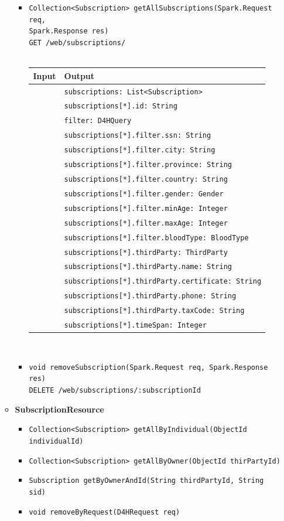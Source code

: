 \documentclass[a4paper, hidelinks, 12pt]{report}
\begin{document}
\begin{itemize}
\begin{itemize}
\begin{itemize}
			\item{\verb|Collection<Subscription> getAllSubscriptions(Spark.Request req,|\\ \verb|Spark.Response res)|\\ \verb|GET /web/subscriptions/|}\\\\
			\begin{tabular}{l | l}
			\textbf{Input} & \textbf{Output} \\
			\hline
				& \verb|subscriptions: List<Subscription>| \\
				& \verb|subscriptions[*].id: String| \\
				& \verb|filter: D4HQuery| \\
				& \verb|subscriptions[*].filter.ssn: String| \\
				& \verb|subscriptions[*].filter.city: String| \\
				& \verb|subscriptions[*].filter.province: String| \\
				& \verb|subscriptions[*].filter.country: String| \\
				& \verb|subscriptions[*].filter.gender: Gender| \\
				& \verb|subscriptions[*].filter.minAge: Integer| \\
				& \verb|subscriptions[*].filter.maxAge: Integer| \\
				& \verb|subscriptions[*].filter.bloodType: BloodType| \\
				& \verb|subscriptions[*].thirdParty: ThirdParty| \\
				& \verb|subscriptions[*].thirdParty.name: String| \\
				& \verb|subscriptions[*].thirdParty.certificate: String| \\
				& \verb|subscriptions[*].thirdParty.phone: String| \\
				& \verb|subscriptions[*].thirdParty.taxCode: String| \\				
				& \verb|subscriptions[*].timeSpan: Integer|  \\
			\end{tabular}\\
			
			\item{\verb|void removeSubscription(Spark.Request req, Spark.Response res)|\\ \verb|DELETE /web/subscriptions/:subscriptionId|} 			
		\end{itemize}
		
				\item{\textbf{SubscriptionResource}}
					\begin{itemize}
						\item{\verb|Collection<Subscription> getAllByIndividual(ObjectId individualId)|}
						\item{\verb|Collection<Subscription> getAllByOwner(ObjectId thirPartyId)|}
						\item{\verb|Subscription getByOwnerAndId(String thirdPartyId, String sid)|}
						\item{\verb|void removeByRequest(D4HRequest req)|}
					\end{itemize}
			\end{itemize}
			

\end{itemize}
\end{document}

